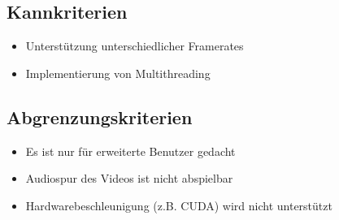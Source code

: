 \subsection{Kannkriterien}

\begin{itemize}
	\item Unterstützung unterschiedlicher Framerates 
	\item Implementierung von Multithreading
\end{itemize}

\subsection{Abgrenzungskriterien}

\begin{itemize}
	\item Es ist nur für erweiterte Benutzer gedacht
	\item Audiospur des Videos ist nicht abspielbar
	\item Hardwarebeschleunigung (z.B. CUDA) wird nicht unterstützt
\end{itemize}
